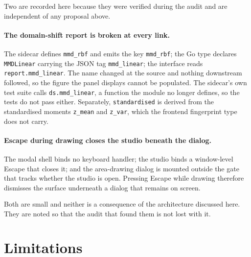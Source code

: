 \documentclass[11pt,a4paper]{article}
\newcommand{\code}[1]{\texttt{\small #1}}
\begin{document}
Two are recorded here because they were verified during the audit and are
independent of any proposal above.

\paragraph{The domain-shift report is broken at every link.} The sidecar
defines \code{mmd\_rbf} and emits the key \code{mmd\_rbf}; the Go type declares
\code{MMDLinear} carrying the JSON tag \code{mmd\_linear}; the interface reads
\code{report.mmd\_linear}. The name changed at the source and nothing
downstream followed, so the figure the panel displays cannot be populated. The
sidecar's own test suite calls \code{ds.mmd\_linear}, a function the module no
longer defines, so the tests do not pass either. Separately,
\code{standardised} is derived from the standardised moments \code{z\_mean} and
\code{z\_var}, which the frontend fingerprint type does not carry.

\paragraph{Escape during drawing closes the studio beneath the dialog.} The
modal shell binds no keyboard handler; the studio binds a window-level Escape
that closes it; and the area-drawing dialog is mounted outside the gate that
tracks whether the studio is open. Pressing Escape while drawing therefore
dismisses the surface underneath a dialog that remains on screen.

Both are small and neither is a consequence of the architecture discussed here.
They are noted so that the audit that found them is not lost with it.

\section{Limitations}
\label{sec:limitations}
\end{document}
